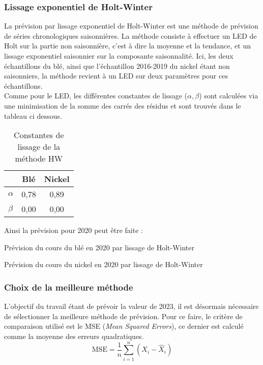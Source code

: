 \subsubsection*{Lissage exponentiel de Holt-Winter}
La prévision par lissage exponentiel de Holt-Winter est une méthode de prévision de séries chronologiques saisonnières. La méthode consiste à effectuer un LED de Holt 
sur la partie non saisonnière, c'est à dire la moyenne et la tendance, et un lissage exponentiel saisonnier sur la composante saisonnalité. Ici, les deux échantillons du
blé, ainsi que l'échantillon 2016-2019 du nickel étant non saisonniers, la méthode revient à un LED sur deux paramètres pour ces échantillons.\\[11pt] 
Comme pour le LED, les différentes constantes de lissage ($\alpha, \beta$) sont calculées via une minimisation de la somme des carrés des résidus et sont trouvés dans le 
tableau ci dessous.
\begin{table}[H]
    \centering
    \caption{Constantes de lissage de la méthode HW}
    \sffamily
    \begin{tabular}{lcc}
        \toprule
        & Blé & Nickel\\
        \midrule
        $\alpha$ & 0,78 & 0,89 \\
        $\beta$ & 0,00 & 0,00\\
        \bottomrule
    \end{tabular}
\end{table}
Ainsi la prévision pour 2020 peut être faite :
\begin{table}[H]
    \centering
    \caption{Prévision du cours du blé en 2020 par lissage de Holt-Winter}
    \sffamily
    
\end{table}

\begin{table}[H]
    \centering
    \caption{Prévision du cours du nickel en 2020 par lissage de Holt-Winter}
    \sffamily
    
\end{table}
\subsubsection{Choix de la meilleure méthode}
L'objectif du travail étant de prévoir la valeur de 2023, il est désormais nécessaire de sélectionner la meilleure méthode de prévision. Pour ce faire, le critère
de comparaison utilisé est le MSE (\textit{Mean Squared Errors}), ce dernier est calculé comme la moyenne des erreurs quadratiques.
\begin{equation*}
    \text{MSE} = \frac{1}{n} \sum_{i=1}^{n} (X_{i} - \hat{X}_{i})
\end{equation*}

